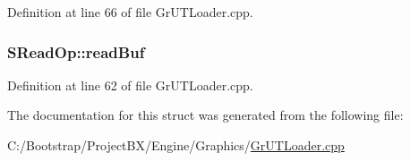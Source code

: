 Definition at line 66 of file GrUTLoader.cpp.\hypertarget{struct_s_read_op_5dfa4e1259cc150ba724f3dfe5347625}{
\subsubsection[{readBuf}]{ {\bf SReadOp::readBuf}}}
\label{struct_s_read_op_5dfa4e1259cc150ba724f3dfe5347625}




Definition at line 62 of file GrUTLoader.cpp.

The documentation for this struct was generated from the following file:\begin{CompactItemize}
\item 
C:/Bootstrap/ProjectBX/Engine/Graphics/\hyperlink{_gr_u_t_loader_8cpp}{GrUTLoader.cpp}\end{CompactItemize}
